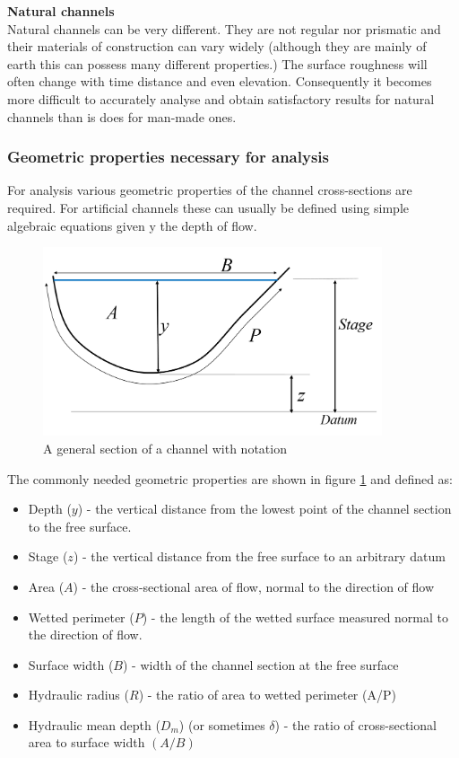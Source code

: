 \documentclass[a4paper, 12pt, british]{article} %
\numberwithin{equation}{section}
\numberwithin{figure}{section}
\numberwithin{table}{section}
\begin{document}
\textbf{Natural channels}\\
Natural channels can be very different. They are not regular nor prismatic and their materials of construction can vary widely (although they are mainly of earth this can possess many different properties.) The surface roughness will often change with time distance and even elevation. Consequently it becomes more difficult to accurately analyse and obtain satisfactory results for natural channels than is does for man-made ones. 

\subsubsection{Geometric properties necessary for analysis}
For analysis various geometric properties of the channel cross-sections are required. For artificial channels these can usually be defined using simple algebraic equations given y the depth of flow. 

\begin{figure}[H]
	\centering
	\includegraphics[width=10cm]{./images/section_general.png}
	\caption{A general section of a channel with notation}
	\label{fig:section_general_0}
\end{figure}

The commonly needed geometric properties are shown in figure \ref{fig:section_general_0} and defined as:

\begin{itemize}
	\item Depth ($y$) - the vertical distance from the lowest point of the channel section to the free surface.
\item Stage ($z$) - the vertical distance from the free surface to an arbitrary datum
\item Area ($A$) - the cross-sectional area of flow, normal to the direction of flow
\item Wetted perimeter ($P$) - the length of the wetted surface measured normal to the direction of flow.
\item Surface width ($B$) - width of the channel section at the free surface
\item Hydraulic radius ($R$) - the ratio of area to wetted perimeter (A/P)
\item Hydraulic mean depth ($D_m$) (or sometimes $\delta$) - the ratio of cross-sectional area to surface width $(A/B)$
\end{itemize}
\end{document}
